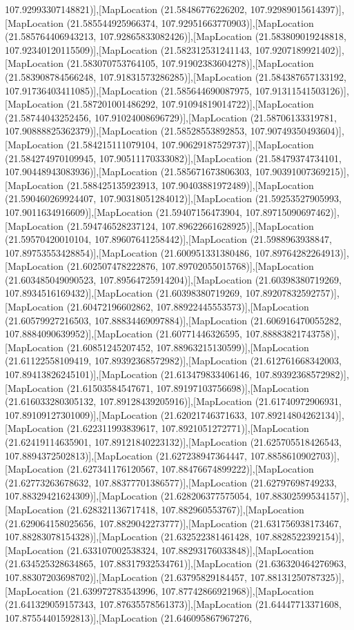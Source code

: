 107.92993307148821)],[MapLocation (21.58486776226202, 107.92989015614397)],[MapLocation (21.585544925966374, 107.92951663770903)],[MapLocation (21.585764406943213, 107.92865833082426)],[MapLocation (21.583809019248818, 107.92340120115509)],[MapLocation (21.582312531241143, 107.9207189921402)],[MapLocation (21.583070753764105, 107.91902383604278)],[MapLocation (21.583908784566248, 107.91831573286285)],[MapLocation (21.584387657133192, 107.91736403411085)],[MapLocation (21.585644690087975, 107.91311541503126)],[MapLocation (21.587201001486292, 107.91094819014722)],[MapLocation (21.58744043252456, 107.91024008696729)],[MapLocation (21.58706133319781, 107.90888825362379)],[MapLocation (21.58528553892853, 107.90749350493604)],[MapLocation (21.584215111079104, 107.90629187529737)],[MapLocation (21.584274970109945, 107.90511170333082)],[MapLocation (21.58479374734101, 107.90448943083936)],[MapLocation (21.585671673806303, 107.90391007369215)],[MapLocation (21.588425135923913, 107.90403881972489)],[MapLocation (21.590460269924407, 107.90318051284012)],[MapLocation (21.59253527905993, 107.9011634916609)],[MapLocation (21.59407156473904, 107.89715090697462)],[MapLocation (21.594746528237124, 107.89622661628925)],[MapLocation (21.59570420010104, 107.89607641258442)],[MapLocation (21.5988963938847, 107.89753553428854)],[MapLocation (21.600951331380486, 107.89764282264913)],[MapLocation (21.602507478222876, 107.89702055015768)],[MapLocation (21.603485049090523, 107.89564725914204)],[MapLocation (21.60398380719269, 107.8934516169432)],[MapLocation (21.60398380719269, 107.89207832592757)],[MapLocation (21.60472196602862, 107.88922445553573)],[MapLocation (21.60579927216503, 107.88834469097884)],[MapLocation (21.606916470055282, 107.8884090639952)],[MapLocation (21.60771446326595, 107.88883821743758)],[MapLocation (21.60851245207452, 107.88963215130599)],[MapLocation (21.61122558109419, 107.89392368572982)],[MapLocation (21.612761668342003, 107.89413826245101)],[MapLocation (21.613479833406146, 107.89392368572982)],[MapLocation (21.61503584547671, 107.89197103756698)],[MapLocation (21.616033280305132, 107.89128439205916)],[MapLocation (21.61740972906931, 107.89109127301009)],[MapLocation (21.62021746371633, 107.89214804262134)],[MapLocation (21.622311993839617, 107.8921051272771)],[MapLocation (21.62419114635901, 107.89121840223132)],[MapLocation (21.625705518426543, 107.8894372502813)],[MapLocation (21.627238947364447, 107.8858610902703)],[MapLocation (21.627341176120567, 107.88476674899222)],[MapLocation (21.62773263678632, 107.88377701386577)],[MapLocation (21.62797698749233, 107.88329421624309)],[MapLocation (21.628206377575054, 107.88302599534157)],[MapLocation (21.628321136717418, 107.882960553767)],[MapLocation (21.629064158025656, 107.8829042273777)],[MapLocation (21.631756938173467, 107.88283078154328)],[MapLocation (21.632522381461428, 107.8828522392154)],[MapLocation (21.633107002538324, 107.88293176033848)],[MapLocation (21.634525328634865, 107.88317932534761)],[MapLocation (21.636320464276963, 107.88307203698702)],[MapLocation (21.63795829184457, 107.88131250787325)],[MapLocation (21.639972783543996, 107.87742866921968)],[MapLocation (21.641329059157343, 107.87635578561373)],[MapLocation (21.64447713371608, 107.87554401592813)],[MapLocation (21.646095867967276, 